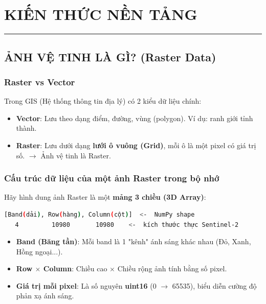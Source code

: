 \documentclass[12pt,a4paper]{report}
\begin{document}
\newpage
\tableofcontents
\newpage

\chapter{KIẾN THỨC NỀN TẢNG}
\noindent\rule{\textwidth}{0.4pt}

\section{ẢNH VỆ TINH LÀ GÌ? (Raster Data)}

\subsection{Raster vs Vector}
Trong GIS (Hệ thống thông tin địa lý) có 2 kiểu dữ liệu chính:
\begin{itemize}
    \item \textbf{Vector}: Lưu theo dạng điểm, đường, vùng (polygon). Ví dụ: ranh giới tỉnh thành.
    \item \textbf{Raster}: Lưu dưới dạng \textbf{lưới ô vuông (Grid)}, mỗi ô là một pixel có giá trị số. $\rightarrow$ Ảnh vệ tinh là Raster.
\end{itemize}

\subsection{Cấu trúc dữ liệu của một ảnh Raster trong bộ nhớ}
Hãy hình dung ảnh Raster là một \textbf{mảng 3 chiều (3D Array)}:

\begin{lstlisting}[language=bash, numbers=none]
[Band(dải), Row(hàng), Column(cột)]  <-  NumPy shape
   4         10980       10980    <-  kích thước thực Sentinel-2
\end{lstlisting}

\begin{itemize}
    \item \textbf{Band (Băng tần)}: Mỗi band là 1 "kênh" ánh sáng khác nhau (Đỏ, Xanh, Hồng ngoại...).
    \item \textbf{Row $\times$ Column}: Chiều cao $\times$ Chiều rộng ảnh tính bằng số pixel.
    \item \textbf{Giá trị mỗi pixel}: Là số nguyên \textbf{uint16} (0 $\rightarrow$ 65535), biểu diễn cường độ phản xạ ánh sáng.
\end{itemize}
\end{document}
